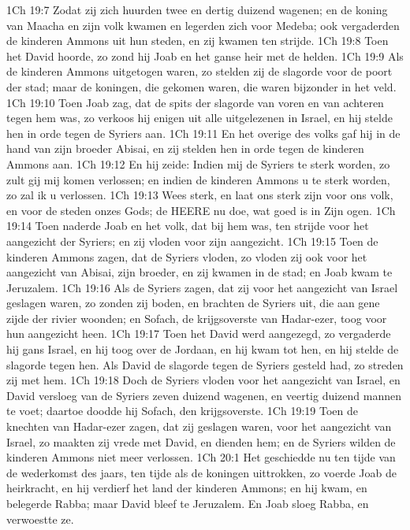 1Ch 19:7  Zodat zij zich huurden twee en dertig duizend wagenen; en de koning van Maacha en zijn volk kwamen en legerden zich voor Medeba; ook vergaderden de kinderen Ammons uit hun steden, en zij kwamen ten strijde.
1Ch 19:8  Toen het David hoorde, zo zond hij Joab en het ganse heir met de helden.
1Ch 19:9  Als de kinderen Ammons uitgetogen waren, zo stelden zij de slagorde voor de poort der stad; maar de koningen, die gekomen waren, die waren bijzonder in het veld.
1Ch 19:10  Toen Joab zag, dat de spits der slagorde van voren en van achteren tegen hem was, zo verkoos hij enigen uit alle uitgelezenen in Israel, en hij stelde hen in orde tegen de Syriers aan.
1Ch 19:11  En het overige des volks gaf hij in de hand van zijn broeder Abisai, en zij stelden hen in orde tegen de kinderen Ammons aan.
1Ch 19:12  En hij zeide: Indien mij de Syriers te sterk worden, zo zult gij mij komen verlossen; en indien de kinderen Ammons u te sterk worden, zo zal ik u verlossen.
1Ch 19:13  Wees sterk, en laat ons sterk zijn voor ons volk, en voor de steden onzes Gods; de HEERE nu doe, wat goed is in Zijn ogen.
1Ch 19:14  Toen naderde Joab en het volk, dat bij hem was, ten strijde voor het aangezicht der Syriers; en zij vloden voor zijn aangezicht.
1Ch 19:15  Toen de kinderen Ammons zagen, dat de Syriers vloden, zo vloden zij ook voor het aangezicht van Abisai, zijn broeder, en zij kwamen in de stad; en Joab kwam te Jeruzalem.
1Ch 19:16  Als de Syriers zagen, dat zij voor het aangezicht van Israel geslagen waren, zo zonden zij boden, en brachten de Syriers uit, die aan gene zijde der rivier woonden; en Sofach, de krijgsoverste van Hadar-ezer, toog voor hun aangezicht heen.
1Ch 19:17  Toen het David werd aangezegd, zo vergaderde hij gans Israel, en hij toog over de Jordaan, en hij kwam tot hen, en hij stelde de slagorde tegen hen. Als David de slagorde tegen de Syriers gesteld had, zo streden zij met hem.
1Ch 19:18  Doch de Syriers vloden voor het aangezicht van Israel, en David versloeg van de Syriers zeven duizend wagenen, en veertig duizend mannen te voet; daartoe doodde hij Sofach, den krijgsoverste.
1Ch 19:19  Toen de knechten van Hadar-ezer zagen, dat zij geslagen waren, voor het aangezicht van Israel, zo maakten zij vrede met David, en dienden hem; en de Syriers wilden de kinderen Ammons niet meer verlossen.
1Ch 20:1  Het geschiedde nu ten tijde van de wederkomst des jaars, ten tijde als de koningen uittrokken, zo voerde Joab de heirkracht, en hij verdierf het land der kinderen Ammons; en hij kwam, en belegerde Rabba; maar David bleef te Jeruzalem. En Joab sloeg Rabba, en verwoestte ze.

